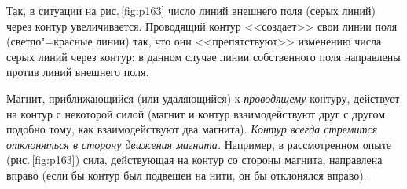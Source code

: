 \documentclass[main.tex]{subfiles}
\begin{document}
\begin{NoHyper}
Так, в ситуации на рис.\,\ref{fig:p163} число линий внешнего поля (серых линий) через контур увеличивается. Проводящий контур <<создает>> свои линии поля (светло"=красные линии) так, что они <<препятствуют>> изменению числа серых линий через контур: в данном случае линии собственного поля направлены против линий внешнего поля.

Магнит, приближающийся (или удаляющийся) к \emph{проводящему} контуру, действует на контур с некоторой силой 
(магнит и контур взаимодействуют друг с другом подобно тому, как взаимодействуют два магнита). 
\emph{Контур всегда стремится отклоняться в сторону движения магнита.} Например, в рассмотренном опыте (рис.\,\ref{fig:p163}) сила, действующая на контур со стороны магнита, направлена вправо (если бы контур был подвешен на нити, он бы отклонялся вправо).  














\end{NoHyper}
\end{document}
